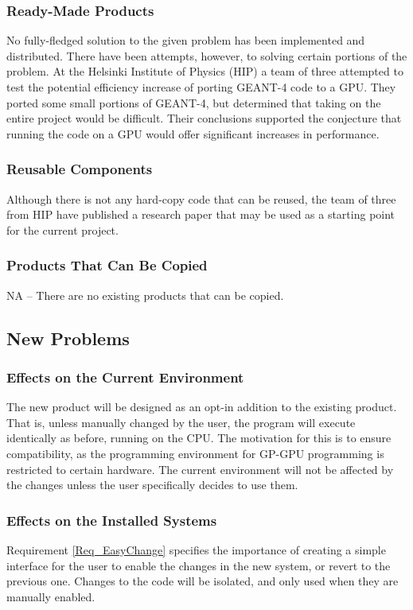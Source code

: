 \documentclass[12pt]{article}
\begin{document}
\subsubsection{Ready-Made Products}
No fully-fledged solution to the given problem has been implemented and distributed. There have been attempts, however, to solving certain portions of the problem. At the Helsinki Institute of Physics (HIP) a team of three attempted to test the potential efficiency increase of porting GEANT-4 code to a GPU. They ported some small portions of GEANT-4, but determined that taking on the entire project would be difficult. Their conclusions supported the conjecture that running the code on a GPU would offer significant increases in performance.

\subsubsection{Reusable Components}
Although there is not any hard-copy code that can be reused, the team of three from HIP have published a research paper that may be used as a starting point for the current project.

\subsubsection{Products That Can Be Copied}
NA -- There are no existing products that can be copied.

\subsection{New Problems}\label{SubSec_NewProbs} %
\subsubsection{Effects on the Current Environment}
The new product will be designed as an opt-in addition to the existing product. That is, unless manually changed by the user, the program will execute identically as before, running on the CPU. The motivation for this is to ensure compatibility, as the programming environment for GP-GPU programming is restricted to certain hardware. The current environment will not be affected by the changes unless the user specifically decides to use them.

\subsubsection{Effects on the Installed Systems}
Requirement \ref{Req_EasyChange} specifies the importance of creating a simple interface for the user to enable the changes in the new system, or revert to the previous one. Changes to the code will be isolated, and only used when they are manually enabled.
\end{document}
